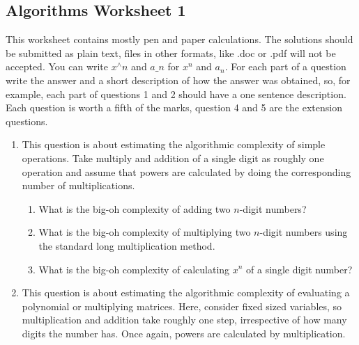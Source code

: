 \documentclass[11pt,a4paper]{scrartcl}
\begin{document}
\subsection*{Algorithms Worksheet 1}

This worksheet contains mostly pen and paper calculations. The
solutions should be submitted as plain text, files in other formats,
like .doc or .pdf will not be accepted. You can write $x^\wedge n$ and
$a\_n$ for $x^n$ and $a_n$. For each part of a question write the
answer and a short description of how the answer was obtained, so, for
example, each part of questions 1 and 2 should have a one sentence
description. Each question is worth a fifth of the marks, question 4
and 5 are the extension questions.

\begin{enumerate}

\item This question is about estimating the algorithmic
  complexity of simple operations. Take multiply and addition of a
  single digit as roughly one operation and assume that powers are
  calculated by doing the corresponding number of multiplications.

\begin{enumerate}
\item What is the big-oh complexity of adding two $n$-digit numbers?
\item What is the big-oh complexity of multiplying two $n$-digit numbers
  using the standard long multiplication method.
\item What is the big-oh complexity of calculating $x^n$ of a single
  digit number?
\end{enumerate}


\item This question is about estimating the algorithmic complexity of
  evaluating a polynomial or multiplying matrices. Here, consider fixed
  sized variables, so multiplication and addition take roughly one
  step, irrespective of how many digits the number has. Once again,
  powers are calculated by multiplication.


\end{enumerate}
\end{document}
